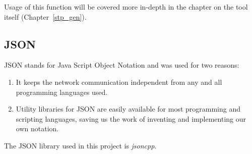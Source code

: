 Usage of this function will be covered more in-depth in the chapter on the tool itself (Chapter~\ref{stp_gen}).
\subsection{JSON}
JSON stands for Java Script Object Notation and was used for two reasons:
\begin{enumerate}
    \item It keeps the network communication independent from any and all programming languages used.
    \item Utility libraries for JSON are easily available for most programming and scripting languages, saving us the work of inventing and implementing our own notation.
\end{enumerate}

The JSON library used in this project is \textit{jsoncpp}\cite{jsoncpp}.
